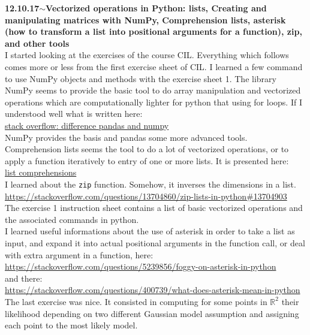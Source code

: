 \documentclass[11pt,a4paper]{article}
\newenvironment{loggentry}[2]%
{\noindent\textbf{#1}\hspace{1cm}$\mathbf{\sim}$\text{ }\textbf{#2}\\}{\vspace{0.5cm}}
\newcommand{\R}{\mathbb{R}}
\begin{document}
\begin{loggentry}{12.10.17}{Vectorized operations in Python: lists, Creating and manipulating matrices with NumPy, Comprehension lists, asterisk (how to transform a list into positional arguments for a function), zip, and other tools}
I started looking at the exercises of the course CIL. Everything which follows comes more or less from the first exercise sheet of CIL. I learned a few command to use NumPy objects and methods with the exercise sheet 1.
The library NumPy seems to provide the basic tool to do array manipulation and vectorized operations which are computationally lighter for python that using for loops. If I understood well what is written here:\\
\href{https://stackoverflow.com/questions/11077023/what-are-the-differences-between-pandas-and-numpyscipy-in-python#11077215}{stack overflow: difference pandas and numpy}\\
NumPy provides the basis and pandas some more advanced tools.\\
Comprehension lists seems the tool to do a lot of vectorized operations, or to apply a function iteratively to entry of one or more lists. It is presented here:\\
\href{https://docs.python.org/2/tutorial/datastructures.html#list-comprehensions}{list comprehensions}\\
I learned about the \texttt{zip} function. Somehow, it inverses the dimensions in a list.\\
\url{https://stackoverflow.com/questions/13704860/zip-lists-in-python#13704903}\\
The exercise 1 instruction sheet contains a list of basic vectorized operations and the associated commands in python.\\
I learned useful informations about the use of asterisk in order to take a list as input, and expand it into actual positional arguments in the function call, or deal with extra argument in a function, here:\\
\url{https://stackoverflow.com/questions/5239856/foggy-on-asterisk-in-python}\\
and there:\\
\url{https://stackoverflow.com/questions/400739/what-does-asterisk-mean-in-python}\\
The last exercise was nice. It consisted in computing for some points in $\R^2$ their likelihood depending on two different Gaussian model assumption and assigning each point to the most likely model.
\end{loggentry}
\end{document}
